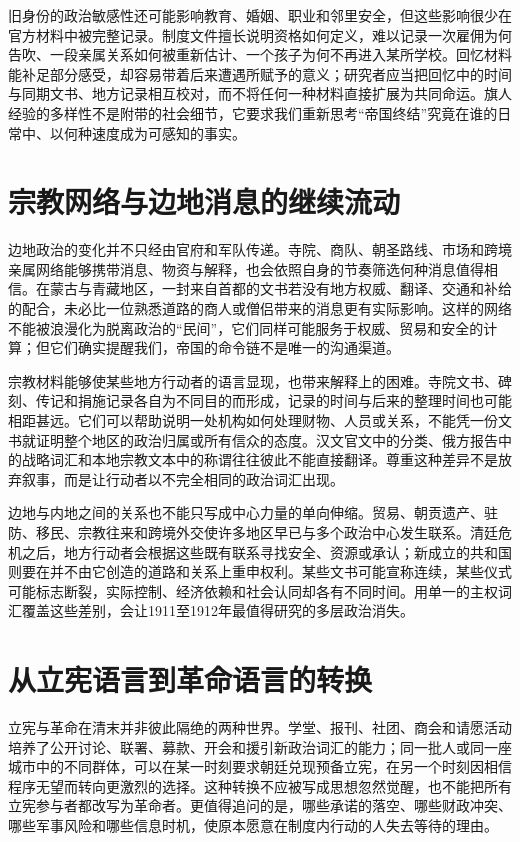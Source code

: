 旧身份的政治敏感性还可能影响教育、婚姻、职业和邻里安全，但这些影响很少在官方材料中被完整记录。制度文件擅长说明资格如何定义，难以记录一次雇佣为何告吹、一段亲属关系如何被重新估计、一个孩子为何不再进入某所学校。回忆材料能补足部分感受，却容易带着后来遭遇所赋予的意义；研究者应当把回忆中的时间与同期文书、地方记录相互校对，而不将任何一种材料直接扩展为共同命运。旗人经验的多样性不是附带的社会细节，它要求我们重新思考“帝国终结”究竟在谁的日常中、以何种速度成为可感知的事实。

\section{宗教网络与边地消息的继续流动}

边地政治的变化并不只经由官府和军队传递。寺院、商队、朝圣路线、市场和跨境亲属网络能够携带消息、物资与解释，也会依照自身的节奏筛选何种消息值得相信。在蒙古与青藏地区，一封来自首都的文书若没有地方权威、翻译、交通和补给的配合，未必比一位熟悉道路的商人或僧侣带来的消息更有实际影响。这样的网络不能被浪漫化为脱离政治的“民间”，它们同样可能服务于权威、贸易和安全的计算；但它们确实提醒我们，帝国的命令链不是唯一的沟通渠道。

宗教材料能够使某些地方行动者的语言显现，也带来解释上的困难。寺院文书、碑刻、传记和捐施记录各自为不同目的而形成，记录的时间与后来的整理时间也可能相距甚远。它们可以帮助说明一处机构如何处理财物、人员或关系，不能凭一份文书就证明整个地区的政治归属或所有信众的态度。汉文官文中的分类、俄方报告中的战略词汇和本地宗教文本中的称谓往往彼此不能直接翻译。尊重这种差异不是放弃叙事，而是让行动者以不完全相同的政治词汇出现。

边地与内地之间的关系也不能只写成中心力量的单向伸缩。贸易、朝贡遗产、驻防、移民、宗教往来和跨境外交使许多地区早已与多个政治中心发生联系。清廷危机之后，地方行动者会根据这些既有联系寻找安全、资源或承认；新成立的共和国则要在并不由它创造的道路和关系上重申权利。某些文书可能宣称连续，某些仪式可能标志断裂，实际控制、经济依赖和社会认同却各有不同时间。用单一的主权词汇覆盖这些差别，会让1911至1912年最值得研究的多层政治消失。

\section{从立宪语言到革命语言的转换}

立宪与革命在清末并非彼此隔绝的两种世界。学堂、报刊、社团、商会和请愿活动培养了公开讨论、联署、募款、开会和援引新政治词汇的能力；同一批人或同一座城市中的不同群体，可以在某一时刻要求朝廷兑现预备立宪，在另一个时刻因相信程序无望而转向更激烈的选择。这种转换不应被写成思想忽然觉醒，也不能把所有立宪参与者都改写为革命者。更值得追问的是，哪些承诺的落空、哪些财政冲突、哪些军事风险和哪些信息时机，使原本愿意在制度内行动的人失去等待的理由。


